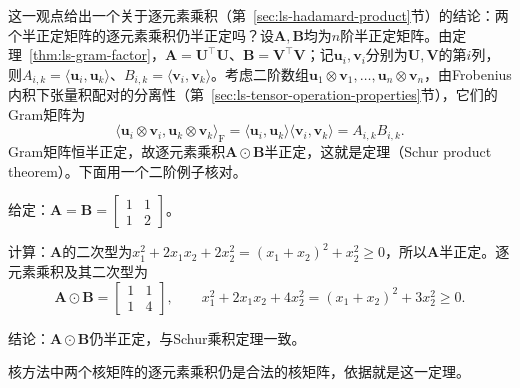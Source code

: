 这一观点给出一个关于逐元素乘积（第~\ref{sec:ls-hadamard-product}节）的结论：两个半正定矩阵的逐元素乘积仍半正定吗？设$\bm A,\bm B$均为$n$阶半正定矩阵。由定理~\ref{thm:ls-gram-factor}，$\bm A=\bm U^\top\bm U$、$\bm B=\bm V^\top\bm V$；记$\bm u_i,\bm v_i$分别为$\bm U,\bm V$的第$i$列，则$A_{i,k}=\langle\bm u_i,\bm u_k\rangle$、$B_{i,k}=\langle\bm v_i,\bm v_k\rangle$。考虑二阶数组$\bm u_1\otimes\bm v_1,\ldots,\bm u_n\otimes\bm v_n$，由Frobenius内积下张量积配对的分离性（第~\ref{sec:ls-tensor-operation-properties}节），它们的Gram矩阵为
\[
 \langle\bm u_i\otimes\bm v_i,\bm u_k\otimes\bm v_k\rangle_{\mathrm F}
 =\langle\bm u_i,\bm u_k\rangle\langle\bm v_i,\bm v_k\rangle
 =A_{i,k}B_{i,k}.
\]
Gram矩阵恒半正定，故逐元素乘积$\bm A\odot\bm B$半正定，这就是定理（Schur product theorem）。下面用一个二阶例子核对。
\begin{example}[两个半正定矩阵的逐元素乘积]
\label{ex:ls-schur-product}
给定：$\bm A=\bm B=\left[\begin{smallmatrix}1&1\\1&2\end{smallmatrix}\right]$。

计算：$\bm A$的二次型为$x_1^2+2x_1x_2+2x_2^2=(x_1+x_2)^2+x_2^2\geq0$，所以$\bm A$半正定。逐元素乘积及其二次型为
\[
 \bm A\odot\bm B=\begin{bmatrix}1&1\\1&4\end{bmatrix},
 \qquad
 x_1^2+2x_1x_2+4x_2^2=(x_1+x_2)^2+3x_2^2\geq0 .
\]

结论：$\bm A\odot\bm B$仍半正定，与Schur乘积定理一致。
\end{example}
核方法中两个核矩阵的逐元素乘积仍是合法的核矩阵，依据就是这一定理。

